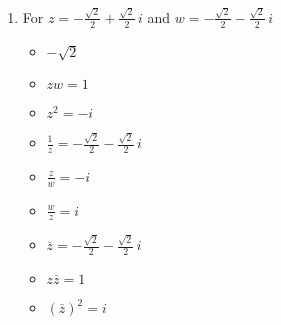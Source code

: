 \begin{enumerate}
\begin{multicols}{3}
\begin{itemize}
\end{itemize}

\end{multicols}

\item  For   $z = -\frac{\sqrt{2}}{2} + \frac{\sqrt{2}}{2} \, i$ and $w = -\frac{\sqrt{2}}{2} - \frac{\sqrt{2}}{2} \, i$

\begin{multicols}{3}

\begin{itemize}

\item $-\sqrt{2}$

\item $zw = 1$

\item $z^2 =-i$

\end{itemize}

\end{multicols}

\begin{multicols}{3}

\begin{itemize}

\item $\frac{1}{z} = -\frac{\sqrt{2}}{2} - \frac{\sqrt{2}}{2} \, i$

\item $\frac{z}{w} = -i$

\item $\frac{w}{z} = i$

\end{itemize}

\end{multicols}

\begin{multicols}{3}

\begin{itemize}

\item $\overline{z} = -\frac{\sqrt{2}}{2} - \frac{\sqrt{2}}{2} \, i$

\item $z\overline{z} = 1$

\item $(\overline{z})^2 = i$

\end{itemize}
\end{multicols}
\setcounter{HW}{\value{enumi}}
\end{enumerate}

